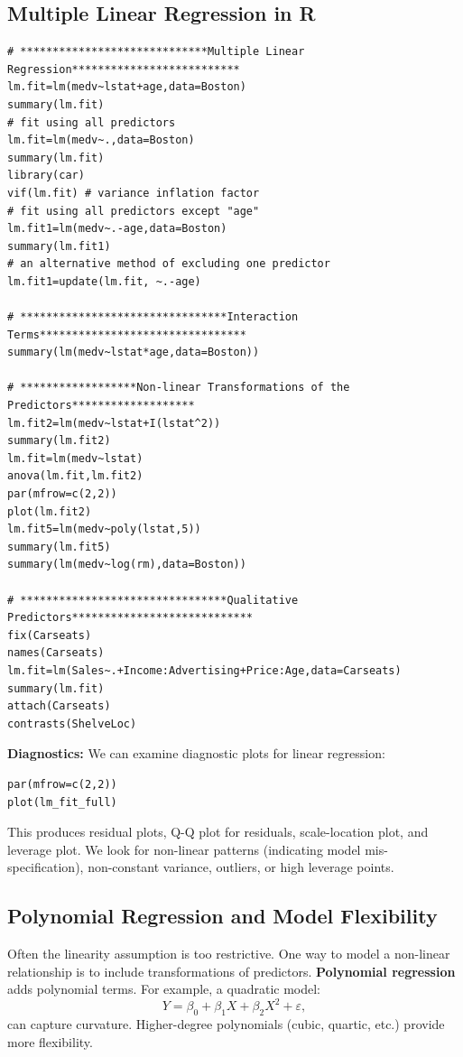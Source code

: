 \documentclass[11pt]{article}
\begin{document}
\subsection{Multiple Linear Regression in R}
\begin{lstlisting}
# *****************************Multiple Linear Regression**************************
lm.fit=lm(medv~lstat+age,data=Boston)
summary(lm.fit)
# fit using all predictors
lm.fit=lm(medv~.,data=Boston)
summary(lm.fit)
library(car)
vif(lm.fit) # variance inflation factor
# fit using all predictors except "age"
lm.fit1=lm(medv~.-age,data=Boston)
summary(lm.fit1)
# an alternative method of excluding one predictor
lm.fit1=update(lm.fit, ~.-age)

# ********************************Interaction Terms********************************
summary(lm(medv~lstat*age,data=Boston))

# ******************Non-linear Transformations of the Predictors*******************
lm.fit2=lm(medv~lstat+I(lstat^2))
summary(lm.fit2)
lm.fit=lm(medv~lstat)
anova(lm.fit,lm.fit2)
par(mfrow=c(2,2))
plot(lm.fit2)
lm.fit5=lm(medv~poly(lstat,5))
summary(lm.fit5)
summary(lm(medv~log(rm),data=Boston))

# ********************************Qualitative Predictors****************************
fix(Carseats)
names(Carseats)
lm.fit=lm(Sales~.+Income:Advertising+Price:Age,data=Carseats)
summary(lm.fit)
attach(Carseats)
contrasts(ShelveLoc)
\end{lstlisting}

\noindent \textbf{Diagnostics:} We can examine diagnostic plots for linear regression:
\begin{lstlisting}
par(mfrow=c(2,2))
plot(lm_fit_full)
\end{lstlisting}
\noindent This produces residual plots, Q-Q plot for residuals, scale-location plot, and leverage plot. We look for non-linear patterns (indicating model mis-specification), non-constant variance, outliers, or high leverage points. 

\subsection{Polynomial Regression and Model Flexibility}
Often the linearity assumption is too restrictive. One way to model a non-linear relationship is to include transformations of predictors. \textbf{Polynomial regression} adds polynomial terms. For example, a quadratic model:
\[ Y = \beta_0 + \beta_1 X + \beta_2 X^2 + \varepsilon, \] 
can capture curvature. Higher-degree polynomials (cubic, quartic, etc.) provide more flexibility. \\
\end{document}
